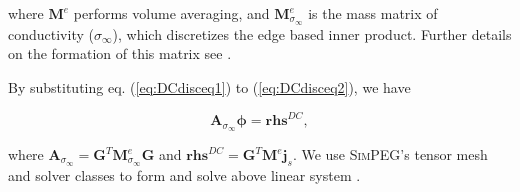 \documentclass[extra,mreferee]{gji}
\newcommand{\SimPEG}{\textsc{SimPEG}\xspace}
\newcommand{\siginf}{\sigma_\infty}
\newcommand{\dgrad}{{\mathbf G}}
\newcommand{\Ace}{{\mathbf A_c^e}}
\newcommand{\diag}{\mathbf{diag}}
\newcommand{\M}{{\mathbf M}}
\newcommand{\MeSigInf}{{\M^e_{\sigma_\infty}}}
\newcommand{\Me}{{\M^e}}
\renewcommand {\dj}  { {\mathbf{j} } }
\newcommand{\vol}{\mathbf{v}}
\newcommand{\A}{\mathbf{A}}
\begin{document}
where $\mathbf{M}^e$ performs volume averaging, and $\mathbf{M}^e_{\siginf}$ is the mass matrix of conductivity ($\siginf$), which discretizes the edge based inner product.
Further details on the formation of this matrix see \cite{Eldadbook}. 

By substituting eq. (\ref{eq:DCdisceq1}) to (\ref{eq:DCdisceq2}), we have
\begin{linenomath*}
\begin{equation}
  \A_{\siginf}\boldsymbol{\phi} = \mathbf{rhs}^{DC},
  \label{eq:DCdiscLin}
\end{equation}
\end{linenomath*}
where $\A_{\siginf} = \dgrad^T \MeSigInf\dgrad$ and $\mathbf{rhs}^{DC} = \dgrad^T \Me\dj_s$. We use \SimPEG's tensor mesh and solver classes to form and solve above linear system \cite[]{Cockett2015}.

\end{document}
